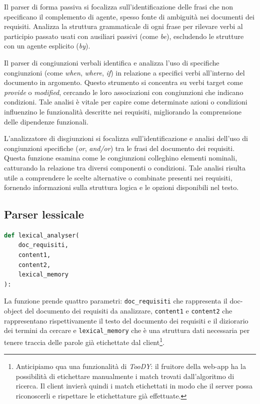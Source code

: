 \documentclass[12pt]{report}
\newcommand{\toody}{\textsl{TooDY}\xspace}
\begin{document}
Il \textsf{parser di forma passiva} si focalizza sull'identificazione delle frasi che non specificano il complemento di agente, spesso fonte di ambiguità nei documenti dei requisiti. Analizza la struttura grammaticale di ogni frase per rilevare verbi al participio passato usati con ausiliari passivi (come \textit{be}), escludendo le strutture con un agente esplicito (\textit{by}).

Il \textsf{parser di congiunzioni verbali} identifica e analizza l'uso di specifiche congiunzioni (come \textit{when}, \textit{where}, \textit{if}) in relazione a specifici verbi all'interno del documento in argomento. Questo strumento si concentra su verbi target come \textit{provide} o \textit{modified}, cercando le loro associazioni con congiunzioni che indicano condizioni. Tale analisi è vitale per capire come determinate azioni o condizioni influenzino le funzionalità descritte nei requisiti, migliorando la comprensione delle dipendenze funzionali.

L'\textsf{analizzatore di disgiunzioni} si focalizza sull'identificazione e analisi dell'uso di congiunzioni specifiche (\textit{or}, \textit{and/or}) tra le frasi del documento dei requisiti. Questa funzione esamina come le congiunzioni colleghino elementi nominali, catturando la relazione tra diversi componenti o condizioni. Tale analisi risulta utile a comprendere le scelte alternative o combinate presenti nei requisiti, fornendo informazioni sulla struttura logica e le opzioni disponibili nel testo.


\subsection{Parser lessicale}
\label{subsec:parser_lessicale}

\begin{mdframed}
\small
\begin{lstlisting}[language=Python]
def lexical_analyser(
    doc_requisiti,
    content1,
    content2,
    lexical_memory
):
\end{lstlisting}
\end{mdframed}

\noindent La funzione prende quattro parametri: \texttt{doc\_requisiti} che rappresenta il doc-object del documento dei requisiti da analizzare, \texttt{content1} e \texttt{content2} che rappresentano rispettivamente il testo del documento dei requisiti e il diziorario dei termini da cercare e \texttt{lexical\_memory} che è una struttura dati necessaria per tenere traccia delle parole già etichettate dal client\footnote{Anticipiamo qua una funzionalità di \toody: il fruitore della web-app ha la possibilità di etichettare manualmente i match trovati dall'algoritmo di ricerca. Il client invierà quindi i match etichettati in modo che il server possa riconoscerli e rispettare le etichettature già effettuate.}.
\end{document}
